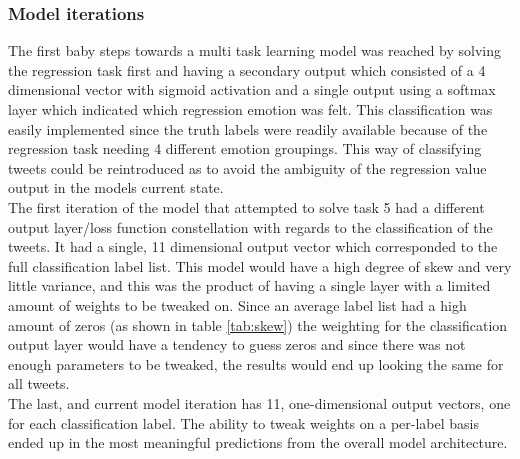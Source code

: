 \subsubsection{Model iterations} \label{sec:iter}
The first baby steps towards a multi task learning model was reached by solving the regression task first and having a secondary output which consisted of a 4 dimensional vector with sigmoid activation and a single output using a softmax layer which indicated which regression emotion was felt. This classification was easily implemented since the truth labels were readily available because of the regression task needing 4 different emotion groupings. This way of classifying tweets could be reintroduced as to avoid the ambiguity of the regression value output in the models current state.\\
The first iteration of the model that attempted to solve task 5 had a different output layer/loss function constellation with regards to the classification of the tweets. It had a single, 11 dimensional output vector which corresponded to the full classification label list. This model would have a high degree of skew and very little variance, and this was the product of having a single layer with a limited amount of weights to be tweaked on. Since an average label list had a high amount of zeros (as shown in table \ref{tab:skew}) the weighting for the classification output layer would have a tendency to guess zeros and since there was not enough parameters to be tweaked, the results would end up looking the same for all tweets.\\
The last, and current model iteration has 11, one-dimensional output vectors, one for each classification label. The ability to tweak weights on a per-label basis ended up in the most meaningful predictions from the overall model architecture.

